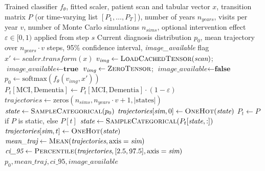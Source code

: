 \documentclass[pdflatex,sn-mathphys-num]{sn-jnl}%
\theoremstyle{thmstyleone}%
\theoremstyle{thmstyletwo}%
\theoremstyle{thmstylethree}%
\begin{document}
\begin{algorithm}
\caption{Digital Twin Patient Simulation}\label{algo2}
\begin{algorithmic}[1]
\Require Trained classifier $f_\theta$, fitted scaler, patient scan and tabular vector $x$, transition matrix $P$ (or time-varying list $[P_1, \ldots, P_T]$), number of years $n_{\textit{years}}$, visits per year $v$, number of Monte Carlo simulations $n_{\textit{sims}}$, optional intervention effect $\varepsilon \in [0,1)$ applied from step $s$
\Ensure Current diagnosis distribution $p_0$, mean trajectory over $n_{\textit{years}} \cdot v$ steps, 95\% confidence interval, \textit{image\_available} flag
\State $x' \gets \textit{scaler.transform}(x)$
    \State $v_{\textit{img}} \gets \Call{LoadCachedTensor}{\textit{scan}}$; $\textit{image\_available} \gets \textbf{true}$
\Else
    \State $v_{\textit{img}} \gets \Call{ZeroTensor}{}$; $\textit{image\_available} \gets \textbf{false}$ 
\EndIf
\State $p_0 \gets \mathrm{softmax}(f_\theta(v_{\textit{img}}, x'))$ 
        \State $P_t[\textrm{MCI}, \textrm{Dementia}] \gets P_t[\textrm{MCI}, \textrm{Dementia}] \cdot (1 - \varepsilon)$ 
        \State {} 
    \EndFor
\EndIf
\State $\textit{trajectories} \gets \textrm{zeros}(n_{\textit{sims}}, n_{\textit{years}} \cdot v + 1, |\textrm{states}|)$
    \State $\textit{state} \gets \Call{SampleCategorical}{p_0}$
    \State $\textit{trajectories}[\textit{sim}, 0] \gets \Call{OneHot}{\textit{state}}$
        \State $P_t \gets P$ if $P$ is static, else $P[t]$ 
        \State $\textit{state} \gets \Call{SampleCategorical}{P_t[\textit{state}, :]}$
        \State $\textit{trajectories}[\textit{sim}, t] \gets \Call{OneHot}{\textit{state}}$
    \EndFor
\EndFor
\State $\textit{mean\_traj} \gets \Call{Mean}{\textit{trajectories}, \textrm{axis}=\textit{sim}}$
\State $\textit{ci\_95} \gets \Call{Percentile}{\textit{trajectories}, [2.5, 97.5], \textrm{axis}=\textit{sim}}$
\State \Return $p_0, \textit{mean\_traj}, \textit{ci\_95}, \textit{image\_available}$
\end{algorithmic}
\end{algorithm}
\end{document}
